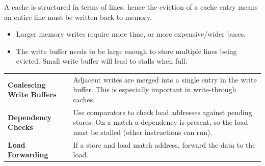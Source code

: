 A cache is structured in terms of lines, hence the eviction of a cache entry means an entire line must be written back to memory.
\begin{itemize}
    \item Larger memory writes require more time, or more expensive/wider buses.
    \item The write buffer needs to be large enough to store multiple lines being evicted. Small write buffer will lead to stalls when full.
\end{itemize}

\begin{center}
    \begin{tabular}{p{} p{}}
        \textbf{Coalescing Write Buffers} & Adjacent writes are merged into a single entry in the write buffer. This is especially important in write-through caches. \\
        \textbf{Dependency Checks} & Use comparators to check load addresses against pending stores. On a match a dependency is present, so the load must be stalled (other instructions can run). \\
        \textbf{Load Forwarding} & If a store and load match address, forward the data to the load. \\
    \end{tabular}
\end{center}

